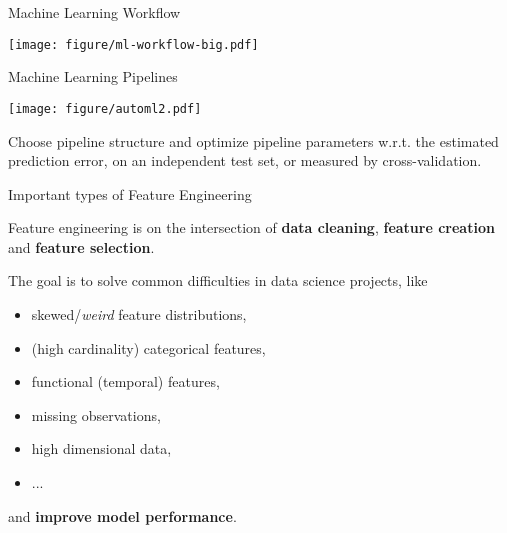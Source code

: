 
\begin{vbframe}{Machine Learning Workflow}

\vfill

\begin{center}
\texttt{[image: figure/ml-workflow-big.pdf]}
\end{center}

\vfill

\end{vbframe}


\begin{vbframe}{Machine Learning Pipelines}

\vfill

\begin{center}
\texttt{[image: figure/automl2.pdf]}
\end{center}

\vfill

Choose pipeline structure and optimize pipeline parameters w.r.t. the estimated prediction error, on an independent test set, or measured by cross-validation.

\end{vbframe}


\begin{vbframe}{Important types of Feature Engineering}

Feature engineering is on the intersection of \textbf{data cleaning}, \textbf{feature creation} and \textbf{feature selection}.

\lz

The goal is to solve common difficulties in data science projects, like

\begin{itemize}
\item skewed/\textit{weird} feature distributions,
\item (high cardinality) categorical features,
\item functional (temporal) features,
\item missing observations,
\item high dimensional data,
\item ...
\end{itemize}

and \textbf{improve model performance}.

\end{vbframe}

